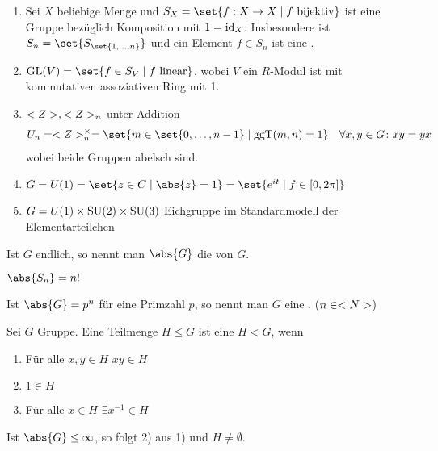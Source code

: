 \begin{example}
	\begin{enumerate}
		\item Sei $X$ beliebige Menge und $S_X = \set{f: X \to X \mid f \text{ bijektiv}}$ ist eine Gruppe bezüglich Komposition mit $1 = \operatorname{id}_X$. Insbesondere ist $S_n = \set{S_{\set{1,\dots,n}}}$  und ein Element $f \in S_n$ ist eine .
		\item $\GL(V) = \set{f \in S_V \mid f \text{ linear}}$, wobei $V$ ein $R$-Modul ist mit kommutativen assoziativen Ring mit 1.
		\item $<Z>, <Z>_n$ unter Addition 
		\begin{align*}
			U_n = \Z^{\times}_n = \set{ m \in \set{0,\dots,n-1} \mid \ggT(m,n) = 1}\quad \forall x,y \in G \colon xy = yx
		\end{align*}
		wobei beide Gruppen abelsch sind.
		\item $G = U(1) = \set{z \in C \mid \abs{z} = 1} = \set{e^{it}\mid f \in [0,2\pi]}$
		\item $G = U(1) \times \operatorname{SU}(2)\times \operatorname{SU}(3)$ Eichgruppe im Standardmodell der Elementarteilchen  
	\end{enumerate}
\end{example}
\begin{definition}[Ordnung]
	Ist $G$ endlich, so nennt man $\abs{G}$ die  von $G$.
\end{definition}
\begin{example}
	$\abs{S_n} = n!$
\end{example}
\begin{definition}[$p$-Gruppe]
	Ist $\abs{G} = p^n$ für eine Primzahl $p$, so nennt man $G$ eine . ($n \in <N>$)
\end{definition}
\begin{definition}[Untergruppe]
	Sei $G$ Gruppe. Eine Teilmenge $H \le G$ ist eine  $H < G$, wenn
	\begin{enumerate}
		\item Für alle $x,y \in H$ $xy \in H$
		\item $1 \in H$
		\item Für alle $x \in H$ $\exists x^{-1} \in H$ 
	\end{enumerate}
\end{definition}
\begin{proposition}
	Ist $\abs{G} \le \infty$, so folgt 2) aus 1)  und $H \neq \emptyset$. %
\end{proposition}
